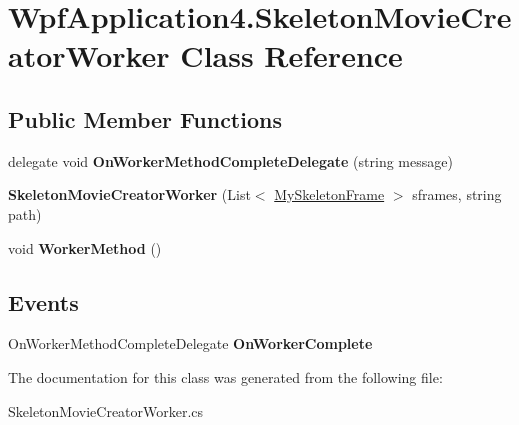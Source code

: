 \hypertarget{class_wpf_application4_1_1_skeleton_movie_creator_worker}{\section{Wpf\-Application4.\-Skeleton\-Movie\-Creator\-Worker Class Reference}
\label{class_wpf_application4_1_1_skeleton_movie_creator_worker}
}
\subsection*{Public Member Functions}
\begin{DoxyCompactItemize}
\item 
\hypertarget{class_wpf_application4_1_1_skeleton_movie_creator_worker_ad8a3321bb908fc63ab5945045aa7c079}{delegate void {\bfseries On\-Worker\-Method\-Complete\-Delegate} (string message)}\label{class_wpf_application4_1_1_skeleton_movie_creator_worker_ad8a3321bb908fc63ab5945045aa7c079}

\item 
\hypertarget{class_wpf_application4_1_1_skeleton_movie_creator_worker_a7099ce69809938f800337867529c41d7}{{\bfseries Skeleton\-Movie\-Creator\-Worker} (List$<$ \hyperlink{class_wpf_application4_1_1_my_skeleton_frame}{My\-Skeleton\-Frame} $>$ sframes, string path)}\label{class_wpf_application4_1_1_skeleton_movie_creator_worker_a7099ce69809938f800337867529c41d7}

\item 
\hypertarget{class_wpf_application4_1_1_skeleton_movie_creator_worker_a931e5c087e646f33c3d2076b79baba57}{void {\bfseries Worker\-Method} ()}\label{class_wpf_application4_1_1_skeleton_movie_creator_worker_a931e5c087e646f33c3d2076b79baba57}

\end{DoxyCompactItemize}
\subsection*{Events}
\begin{DoxyCompactItemize}
\item 
\hypertarget{class_wpf_application4_1_1_skeleton_movie_creator_worker_a3629ac42007cd7befbf986d8288ff852}{On\-Worker\-Method\-Complete\-Delegate {\bfseries On\-Worker\-Complete}}\label{class_wpf_application4_1_1_skeleton_movie_creator_worker_a3629ac42007cd7befbf986d8288ff852}

\end{DoxyCompactItemize}


The documentation for this class was generated from the following file\-:\begin{DoxyCompactItemize}
\item 
Skeleton\-Movie\-Creator\-Worker.\-cs\end{DoxyCompactItemize}
